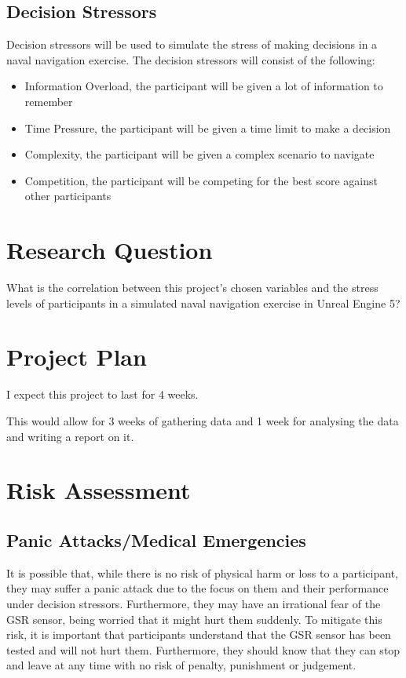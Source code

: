 \documentclass{article}
\begin{document}
\subsection{Decision Stressors}

Decision stressors will be used to simulate the stress of making decisions in a naval navigation exercise. The decision stressors will consist of the following:

\begin{itemize}
    \item Information Overload, the participant will be given a lot of information to remember
    \item Time Pressure, the participant will be given a time limit to make a decision
    \item Complexity, the participant will be given a complex scenario to navigate
    \item Competition, the participant will be competing for the best score against other participants
\end{itemize}

\section{Research Question}

What is the correlation between this project's chosen variables and the stress levels of participants in a simulated naval navigation exercise in Unreal Engine 5?

\section{Project Plan}

I expect this project to last for 4 weeks.

This would allow for 3 weeks of gathering data and 1 week for analysing the data and writing a report on it.

\section{Risk Assessment}

\subsection{Panic Attacks/Medical Emergencies}

It is possible that, while there is no risk of physical harm or loss to a participant, they may suffer a panic attack due to the focus on them and their performance under decision stressors. Furthermore, they may have an irrational fear of the GSR sensor, being worried that it might hurt them suddenly. To mitigate this risk, it is important that participants understand that the GSR sensor has been tested and will not hurt them. Furthermore, they should know that they can stop and leave at any time with no risk of penalty, punishment or judgement.
\end{document}

